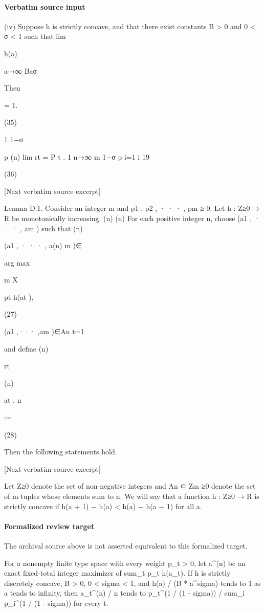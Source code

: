 \documentclass[10pt]{article}
\begin{document}
\paragraph{Verbatim source input}
\begin{ReviewVerbatim}
(iv) Suppose h is strictly concave, and that there exist constants B > 0 and 0 < σ < 1 such that
lim

h(a)

a→∞ Baσ

Then

= 1.

(35)

1
1−σ

p
(n)
lim rt = P t
.
1
n→∞
m
1−σ
p
i=1 i
19

(36)

[Next verbatim source excerpt]

Lemma D.1. Consider an integer m and p1 , p2 , · · · , pm ≥ 0. Let h : Z≥0 → R be monotonically increasing.
(n)
(n)
For each positive integer n, choose (a1 , · · · , am ) such that
(n)

(a1 , · · · , a(n)
m )∈

arg max

m
X

pt h(at ),

(27)

(a1 ,··· ,am )∈An t=1

and define
(n)

rt

(n)

at
.
n

:=

(28)

Then the following statements hold.

[Next verbatim source excerpt]

Let Z≥0 denote the set of non-negative integers and An ⊂ Zm
≥0 denote the set of m-tuples whose elements
sum to n. We will say that a function h : Z≥0 → R is strictly concave if h(a + 1) − h(a) < h(a) − h(a − 1)
for all a.
\end{ReviewVerbatim}


\paragraph{Formalized review target}
The archival source above is not asserted equivalent to this formalized target.
\begin{ReviewVerbatim}
For a nonempty finite type space with every weight p_t > 0, let a^(n) be an exact fixed-total integer maximizer of sum_t p_t h(a_t). If h is strictly discretely concave, B > 0, 0 < sigma < 1, and h(a) / (B * a^sigma) tends to 1 as a tends to infinity, then a_t^(n) / n tends to p_t^(1 / (1 - sigma)) / sum_i p_i^(1 / (1 - sigma)) for every t.
\end{ReviewVerbatim}
\end{document}
